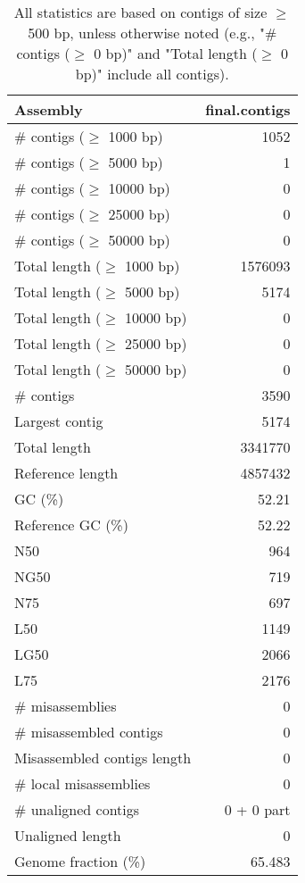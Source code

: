 \documentclass[12pt,a4paper]{article}
\begin{document}
\begin{table}[ht]
\begin{center}
\caption{All statistics are based on contigs of size $\geq$ 500 bp, unless otherwise noted (e.g., "\# contigs ($\geq$ 0 bp)" and "Total length ($\geq$ 0 bp)" include all contigs).}
\begin{tabular}{|l*{1}{|r}|}
\hline
Assembly & final.contigs \\ \hline
\# contigs ($\geq$ 1000 bp) & 1052 \\ \hline
\# contigs ($\geq$ 5000 bp) & 1 \\ \hline
\# contigs ($\geq$ 10000 bp) & 0 \\ \hline
\# contigs ($\geq$ 25000 bp) & 0 \\ \hline
\# contigs ($\geq$ 50000 bp) & 0 \\ \hline
Total length ($\geq$ 1000 bp) & 1576093 \\ \hline
Total length ($\geq$ 5000 bp) & 5174 \\ \hline
Total length ($\geq$ 10000 bp) & 0 \\ \hline
Total length ($\geq$ 25000 bp) & 0 \\ \hline
Total length ($\geq$ 50000 bp) & 0 \\ \hline
\# contigs & 3590 \\ \hline
Largest contig & 5174 \\ \hline
Total length & 3341770 \\ \hline
Reference length & 4857432 \\ \hline
GC (\%) & 52.21 \\ \hline
Reference GC (\%) & 52.22 \\ \hline
N50 & 964 \\ \hline
NG50 & 719 \\ \hline
N75 & 697 \\ \hline
L50 & 1149 \\ \hline
LG50 & 2066 \\ \hline
L75 & 2176 \\ \hline
\# misassemblies & 0 \\ \hline
\# misassembled contigs & 0 \\ \hline
Misassembled contigs length & 0 \\ \hline
\# local misassemblies & 0 \\ \hline
\# unaligned contigs & 0 + 0 part \\ \hline
Unaligned length & 0 \\ \hline
Genome fraction (\%) & 65.483 \\ \hline

\end{tabular}
\end{center}
\end{table}
\end{document}
